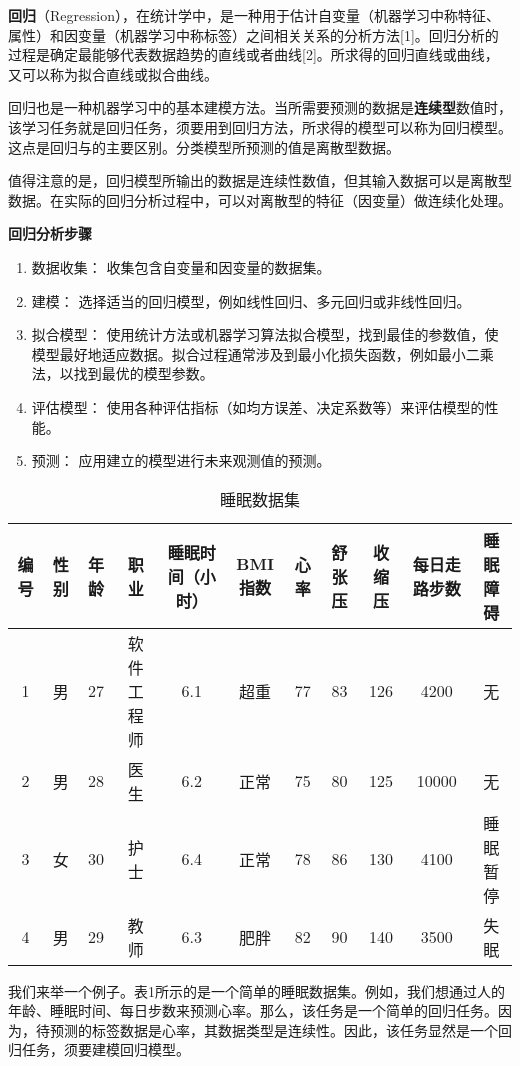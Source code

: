 
\textbf{回归}（Regression），在统计学中，是一种用于估计自变量（机器学习中称特征、属性）和因变量（机器学习中称标签）之间相关关系的分析方法[1]。回归分析的过程是确定最能够代表数据趋势的直线或者曲线[2]。所求得的回归直线或曲线，又可以称为拟合直线或拟合曲线。

回归也是一种机器学习中的基本建模方法。当所需要预测的数据是\textbf{连续型}数值时，该学习任务就是回归任务，须要用到回归方法，所求得的模型可以称为回归模型。这点是回归与的主要区别。分类模型所预测的值是离散型数据。

值得注意的是，回归模型所输出的数据是连续性数值，但其输入数据可以是离散型数据。在实际的回归分析过程中，可以对离散型的特征（因变量）做连续化处理。

\textbf{回归分析步骤}
\begin{enumerate}
\item 数据收集： 收集包含自变量和因变量的数据集。
\item 建模： 选择适当的回归模型，例如线性回归、多元回归或非线性回归。
\item 拟合模型： 使用统计方法或机器学习算法拟合模型，找到最佳的参数值，使模型最好地适应数据。拟合过程通常涉及到最小化损失函数，例如最小二乘法，以找到最优的模型参数。
\item 评估模型： 使用各种评估指标（如均方误差、决定系数等）来评估模型的性能。
\item 预测： 应用建立的模型进行未来观测值的预测。
\end{enumerate}

\begin{table}[ht]
\centering
\caption{睡眠数据集}\label{tab_Regres1}
\begin{tabular}{|c|c|c|c|c|c|c|c|c|c|c|}
\hline
编号 & 性别 & 年龄 & 职业 & 睡眠时间（小时） & BMI指数 & 心率 & 舒张压 & 收缩压 & 每日走路步数 & 睡眠障碍 \\\hline
1 & 男 & 27 & 软件工程师 & 6.1 & 超重 & 77 & 83 & 126 & 4200 & 无 \\
\hline
2 & 男 & 28 & 医生 & 6.2 & 正常 & 75 & 80 & 125 & 10000 & 无 \\
\hline
3 & 女 & 30 & 护士 & 6.4 & 正常 & 78 & 86 & 130 & 4100 & 睡眠暂停 \\
\hline
4 & 男 & 29 & 教师 & 6.3 & 肥胖 & 82 & 90 & 140 & 3500 & 失眠 \\
\hline
\end{tabular}
\end{table}

我们来举一个例子。表1所示的是一个简单的睡眠数据集。例如，我们想通过人的年龄、睡眠时间、每日步数来预测心率。那么，该任务是一个简单的回归任务。因为，待预测的标签数据是心率，其数据类型是连续性。因此，该任务显然是一个回归任务，须要建模回归模型。

